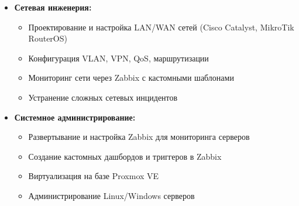 \documentclass[11pt]{article}
\begin{document}
\begin{itemize}
\begin{itemize}
        \item \textbf{Сетевая инженерия:}
        \begin{itemize}
            \item Проектирование и настройка LAN/WAN сетей (Cisco Catalyst, MikroTik RouterOS)
            \item Конфигурация VLAN, VPN, QoS, маршрутизации
            \item Мониторинг сети через Zabbix с кастомными шаблонами
            \item Устранение сложных сетевых инцидентов
        \end{itemize}
    
        \item \textbf{Системное администрирование:}
        \begin{itemize}
            \item Развертывание и настройка Zabbix для мониторинга серверов
            \item Создание кастомных дашбордов и триггеров в Zabbix
            \item Виртуализация на базе Proxmox VE
            \item Администрирование Linux/Windows серверов
        \end{itemize}
    

\end{itemize}
\end{itemize}
\end{document}
